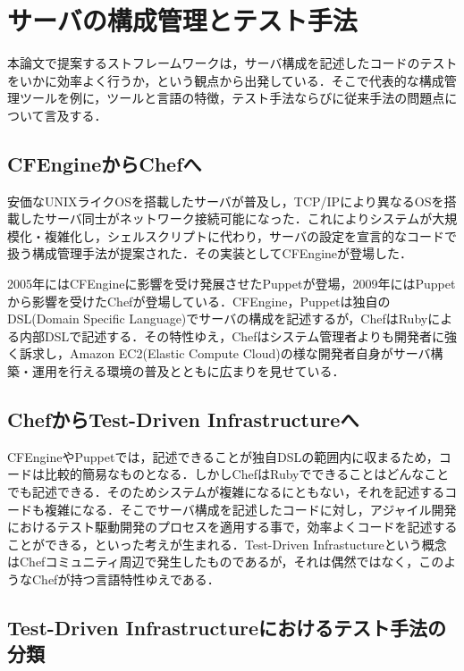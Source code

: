 \section{サーバの構成管理とテスト手法}

本論文で提案するストフレームワークは，サーバ構成を記述したコードのテストをいかに効率よく行うか，という観点から出発している．そこで代表的な構成管理ツールを例に，ツールと言語の特徴，テスト手法ならびに従来手法の問題点について言及する．

\subsection{CFEngineからChefへ}

安価なUNIXライクOSを搭載したサーバが普及し，TCP/IPにより異なるOSを搭載したサーバ同士がネットワーク接続可能になった．これによりシステムが大規模化・複雑化し，シェルスクリプトに代わり，サーバの設定を宣言的なコードで扱う構成管理手法が提案された．その実装としてCFEngine\cite{cfengine}が登場した．

2005年にはCFEngineに影響を受け発展させたPuppet\cite{puppet}が登場，2009年にはPuppetから影響を受けたChef\cite{chef}が登場している．CFEngine，Puppetは独自のDSL(Domain Specific Language)でサーバの構成を記述するが，ChefはRubyによる内部DSLで記述する．その特性ゆえ，Chefはシステム管理者よりも開発者に強く訴求し，Amazon EC2(Elastic Compute Cloud)の様な開発者自身がサーバ構築・運用を行える環境の普及とともに広まりを見せている．

\subsection{ChefからTest-Driven Infrastructureへ}

CFEngineやPuppetでは，記述できることが独自DSLの範囲内に収まるため，コードは比較的簡易なものとなる．しかしChefはRubyでできることはどんなことでも記述できる．そのためシステムが複雑になるにともない，それを記述するコードも複雑になる．そこでサーバ構成を記述したコードに対し，アジャイル開発におけるテスト駆動開発のプロセスを適用する事で，効率よくコードを記述することができる，といった考えが生まれる．Test-Driven Infrastuctureという概念はChefコミュニティ周辺で発生したものであるが，それは偶然ではなく，このようなChefが持つ言語特性ゆえである．

\subsection{Test-Driven Infrastructureにおけるテスト手法の分類}

